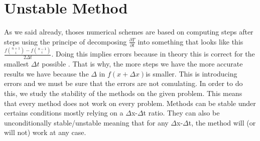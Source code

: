 \documentclass[12pt, a4paper]{report}
\begin{document}
\section{Unstable Method}
As we said already, thoses numerical schemes are based on computing steps after steps using the principe of decomposing $\frac{\partial T}{\partial t}$ into something that looks like this $\frac{f\binom{n+1}{i} - f\binom{n-1}{i}}{2\Delta t}$. Doing this implies errors because in theory this is correct for the smallest $\Delta t$ possible . That is why, the more steps we have the more accurate results we have because the $\Delta$ in $f(x+\Delta x)$is smaller. This is introducing errors and we must be sure that the errors are not comulating. In order to do this, we study the stability of the methods on the given problem. This means that every method does not work on every problem. Methods can be stable under certains conditions mostly relying on a $\Delta$x-$\Delta$t ratio. They can also be unconditionally stable/unstable meaning that for any $\Delta$x-$\Delta$t, the method will (or will not) work at any case.
\end{document}
